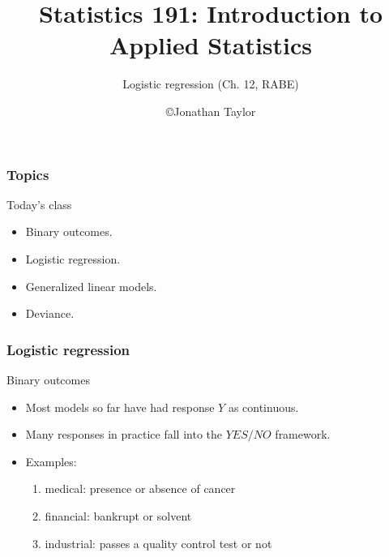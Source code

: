 \documentclass[handout]{beamer}
\title{Statistics 191: Introduction to Applied Statistics}
\subtitle{Logistic regression (Ch. 12, RABE)}
\author{\copyright Jonathan Taylor \\
   }
\begin{document}
   \begin{frame}
   \titlepage
   \end{frame}


   \begin{frame} \frametitle{Topics}

   \begin{block}
   {Today's class}
     \begin{itemize}


     \item Binary outcomes.

     \item Logistic regression.

     \item Generalized linear models.

     \item Deviance.

   \end{itemize}

   \end{block}
   \end{frame}


   \begin{frame} \frametitle{Logistic regression}

   \begin{block}
       {Binary outcomes}
       \begin{itemize}
       \item Most models so far have had response $Y$ as continuous.

       \item Many responses in practice fall into the $YES/NO$ framework.

       \item Examples:
         \begin{enumerate}
         \item medical: presence or absence of cancer

         \item financial: bankrupt or solvent

         \item industrial: passes a quality control test or not
         \end{enumerate}
       \end{itemize}
   \end{block}
   \end{frame}
\end{document}
